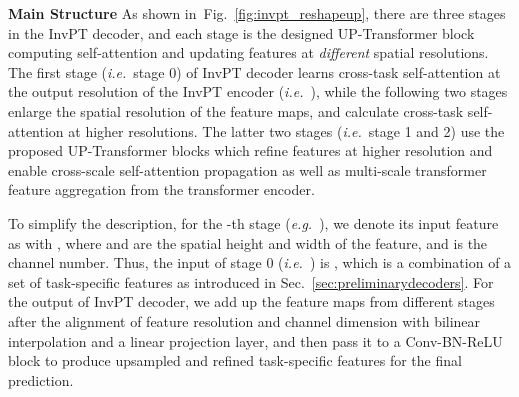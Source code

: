 \documentclass[runningheads]{llncs}
\newcommand*{\eg}{\emph{e.g.}}
\newcommand*{\ie}{\emph{i.e.}}
\begin{document}
\vspace{3pt}
\par\noindent\textbf{Main Structure} As shown in~Fig.~\ref{fig:invpt_reshapeup}, there are three stages in the InvPT decoder, and each stage is the designed UP-Transformer block computing self-attention and updating features at \emph{different} spatial resolutions. The first stage (\ie~stage 0) of InvPT decoder learns cross-task self-attention at the output resolution of the InvPT encoder (\ie~), while
the following two stages enlarge the spatial resolution of the feature maps, and calculate cross-task self-attention at higher resolutions.
The latter two stages (\ie~stage 1 and 2) use the proposed UP-Transformer blocks which refine features at higher resolution and enable cross-scale self-attention propagation as well as multi-scale transformer feature aggregation from the transformer encoder.

\par To simplify the description, for the -th stage (\eg~), we denote its input feature as  with , where  and  are the spatial height and width of the feature, and  is the channel number. Thus, the input of stage 0 (\ie~) is , which is a combination of a set of  task-specific features as introduced in Sec.~\ref{sec:preliminarydecoders}.
For the output of InvPT decoder, we add up the feature maps from different stages after the alignment of feature resolution and channel dimension with bilinear interpolation and a linear projection layer, and then pass it to a Conv-BN-ReLU block to produce  upsampled and refined task-specific features for the final prediction.
\end{document}
